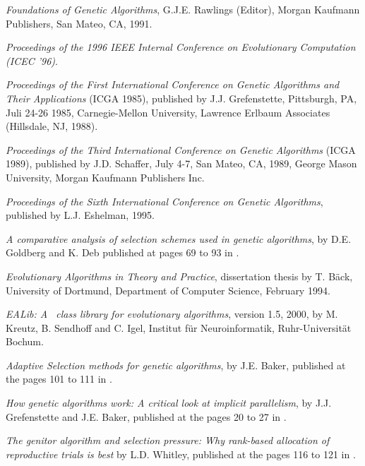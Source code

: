 \begin{thebibliography}{55}
 
    {\em Foundations of Genetic Algorithms}, G.J.E. Rawlings (Editor),
    Morgan Kaufmann Publishers, San Mateo, CA, 1991.

    {\em Proceedings of the 1996 IEEE Internal Conference on Evolutionary 
    Computation (ICEC '96)}.
   
    {\em Proceedings of the First International Conference on Genetic 
    Algorithms and Their Applications} (ICGA 1985), published by
    J.J. Grefenstette, Pittsburgh, PA, Juli 24-26 1985, Carnegie-Mellon 
    University, Lawrence Erlbaum Associates (Hillsdale, NJ, 1988).

    {\em Proceedings of the Third International Conference on Genetic 
    Algorithms} (ICGA 1989), published by J.D. Schaffer, July 4-7, 
    San Mateo, CA, 1989, George Mason University, Morgan Kaufmann 
    Publishers Inc.

    {\em Proceedings of the Sixth International Conference on Genetic
    Algorithms}, published by L.J. Eshelman, 1995.

    {\em A comparative analysis of selection schemes used in genetic
    algorithms}, by D.E. Goldberg and K. Deb published at pages
    69 to 93 in \cite{Foundations}.

    {\em Evolutionary Algorithms in Theory and Practice}, 
    dissertation thesis by T. B\"ack, University of Dortmund, 
    Department of Computer Science, February 1994.

    {\em EALib: A \cpp\ class library for evolutionary algorithms}, 
    version 1.5, 2000, by M. Kreutz, B. Sendhoff and C. Igel, 
    Institut f\"ur Neuroinformatik, Ruhr-Universit\"at Bochum.

    {\em Adaptive Selection methods for genetic algorithms}, by J.E. Baker, 
    published at the pages 101 to 111 in \cite{First}.

    {\em How genetic algorithms work: A critical look at implicit
    parallelism}, by J.J. Grefenstette and J.E. Baker, published
    at the pages 20 to 27 in \cite{Third}. 

    {\em The genitor algorithm and selection pressure:
    Why rank-based allocation of reproductive trials is best} by L.D.
    Whitley, published at the pages 116 to 121 in \cite{Third}.


\end{thebibliography}

